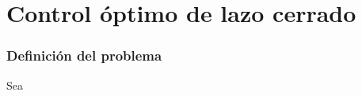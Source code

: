 \section{Control óptimo de lazo cerrado}
\begin{frame}
    \frametitle{Definición del problema}
    \begin{definition}
        Sea 
    \end{definition}
\end{frame}


    
